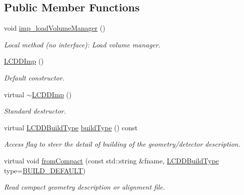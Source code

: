 \subsection*{Public Member Functions}
\begin{DoxyCompactItemize}
\item 
void \hyperlink{class_d_d4hep_1_1_geometry_1_1_l_c_d_d_imp_af1c734df7d03b3e7903e1c25c508d153}{imp\+\_\+load\+Volume\+Manager} ()
\begin{DoxyCompactList}\small\item\em Local method (no interface)\+: Load volume manager. \end{DoxyCompactList}\item 
\hyperlink{class_d_d4hep_1_1_geometry_1_1_l_c_d_d_imp_ac9cfc0155701a769a74fcf67d58d8749}{L\+C\+D\+D\+Imp} ()
\begin{DoxyCompactList}\small\item\em Default constructor. \end{DoxyCompactList}\item 
virtual \hyperlink{class_d_d4hep_1_1_geometry_1_1_l_c_d_d_imp_a75a7b388970a2f18f79a8eddbc451411}{$\sim$\+L\+C\+D\+D\+Imp} ()
\begin{DoxyCompactList}\small\item\em Standard destructor. \end{DoxyCompactList}\item 
virtual \hyperlink{namespace_d_d4hep_acafe43ba4537ab6e999e808142965fab}{L\+C\+D\+D\+Build\+Type} \hyperlink{class_d_d4hep_1_1_geometry_1_1_l_c_d_d_imp_ae875ad95398b372818df92a1e6752ff5}{build\+Type} () const
\begin{DoxyCompactList}\small\item\em Access flag to steer the detail of building of the geometry/detector description. \end{DoxyCompactList}\item 
virtual void \hyperlink{class_d_d4hep_1_1_geometry_1_1_l_c_d_d_imp_a4eb2edfae225abead99a6cd6a85e84f7}{from\+Compact} (const std\+::string \&fname, \hyperlink{namespace_d_d4hep_acafe43ba4537ab6e999e808142965fab}{L\+C\+D\+D\+Build\+Type} type=\hyperlink{namespace_d_d4hep_acafe43ba4537ab6e999e808142965fabaceac720f961afd2369fcc9f343113a2e}{B\+U\+I\+L\+D\+\_\+\+D\+E\+F\+A\+U\+LT})
\begin{DoxyCompactList}\small\item\em Read compact geometry description or alignment file. \end{DoxyCompactList}\item 

\end{DoxyCompactItemize}
